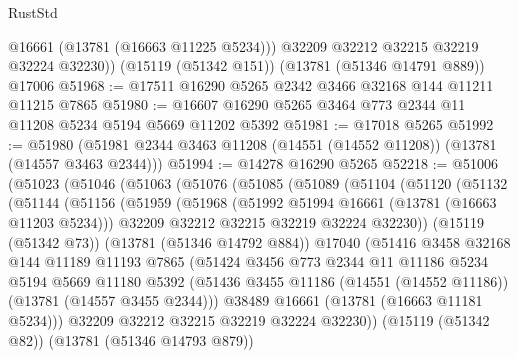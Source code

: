\begin{lexlean}{RustStd}
\begin{coremodule}
          @16661
          (@13781 (@16663 @11225 @5234)))
        @32209
        @32212
        @32215
        @32219
        @32224
        @32230))
    (@15119 (@51342 @151))
    (@13781 (@51346 @14791 @889))
    @17006
@51968 := @17511 @16290 @5265 @2342 @3466 @32168 @144 @11211 @11215 @7865
@51980 := @16607 @16290 @5265 @3464 @773 @2344 @11 @11208 @5234 @5194 @5669 @11202 @5392
@51981 := @17018 @5265
@51992 := @51980 (@51981 @2344 @3463 @11208 (@14551 (@14552 @11208)) (@13781 (@14557 @3463 @2344)))
@51994 := @14278 @16290 @5265
@52218 := @51006
    (@51023
      (@51046
        (@51063
          (@51076
            (@51085
              (@51089
                (@51104
                  (@51120
                    (@51132
                      (@51144
                        (@51156
                          (@51959
                            (@51968
                              (@51992 @51994 @16661 (@13781 (@16663 @11203 @5234)))
                              @32209
                              @32212
                              @32215
                              @32219
                              @32224
                              @32230))
                          (@15119 (@51342 @73))
                          (@13781 (@51346 @14792 @884))
                          @17040
                          (@51416
                            @3458
                            @32168
                            @144
                            @11189
                            @11193
                            @7865
                            (@51424
                              @3456
                              @773
                              @2344
                              @11
                              @11186
                              @5234
                              @5194
                              @5669
                              @11180
                              @5392
                              (@51436
                                @3455
                                @11186
                                (@14551 (@14552 @11186))
                                (@13781 (@14557 @3455 @2344)))
                              @38489
                              @16661
                              (@13781 (@16663 @11181 @5234)))
                            @32209
                            @32212
                            @32215
                            @32219
                            @32224
                            @32230))
                        (@15119 (@51342 @82))
                        (@13781 (@51346 @14793 @879))

\end{coremodule}
\end{lexlean}
